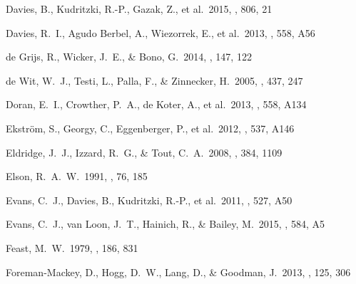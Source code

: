 \documentclass[useAMS,usenatbib]{mn2e}
\begin{document}
\begin{thebibliography}{99}
 Davies, B., Kudritzki,
R.-P., Gazak, Z., et al.\ 2015, \apj, 806, 21

 Davies, R.~I., Agudo Berbel, A., Wiezorrek, E., et al.\ 2013, \aap, 558, A56


 de Grijs, R., Wicker,
J.~E., \& Bono, G.\ 2014, \aj, 147, 122

 de Wit, W.~J., Testi, L., Palla, F., \& Zinnecker, H.\ 2005, \aap, 437, 247

 Doran, E.~I., Crowther, P.~A., de Koter, A., et al.\ 2013, \aap, 558, A134

 Ekstr{\"o}m, S., Georgy, C., Eggenberger, P., et al.\ 2012, \aap, 537, A146

 Eldridge, J.~J.,
Izzard, R.~G., \& Tout, C.~A.\ 2008, \mnras, 384, 1109

 Elson, R.~A.~W.\ 1991, \apjs,
76, 185


 Evans, C.~J., Davies, B., Kudritzki, R.-P., et al.\ 2011, \aap, 527, A50


 Evans, C.~J., van Loon, J.~T., Hainich, R., \& Bailey, M.\ 2015, \aap, 584, A5

 Feast, M.~W.\ 1979, \mnras, 186,
831



 Foreman-Mackey,
D., Hogg, D.~W., Lang, D., \& Goodman, J.\ 2013, \pasp, 125, 306


\end{thebibliography}
\end{document}
